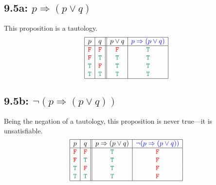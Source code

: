 \documentclass{article}
\begin{document}
\subsection*{9.5a: $p\Rightarrow(p\lor q)$}
This proposition is a tautology.
\[\begin{array}{|c|c||c|c|}
\hline
p&q&p\lor q&\textcolor{blue}{p\Rightarrow(p\lor q)}\\
\hline
\textcolor{red}{\tt{F}}&\textcolor{red}{\tt{F}}&\textcolor{red}{\tt{F}}&\textcolor{ForestGreen}{\tt{T}}\\
\textcolor{red}{\tt{F}}&\textcolor{ForestGreen}{\tt{T}}&\textcolor{ForestGreen}{\tt{T}}&\textcolor{ForestGreen}{\tt{T}}\\
\textcolor{ForestGreen}{\tt{T}}&\textcolor{red}{\tt{F}}&\textcolor{ForestGreen}{\tt{T}}&\textcolor{ForestGreen}{\tt{T}}\\
\textcolor{ForestGreen}{\tt{T}}&\textcolor{ForestGreen}{\tt{T}}&\textcolor{ForestGreen}{\tt{T}}&\textcolor{ForestGreen}{\tt{T}}\\
\hline
\end{array}\]
\subsection*{9.5b: $\neg(p\Rightarrow(p\lor q))$}
Being the negation of a tautology, this proposition is never true---it is unsatisfiable.
\[\begin{array}{|c|c||c|c|}
\hline
p&q&p\Rightarrow(p\lor q)&\textcolor{blue}{\neg(p\Rightarrow(p\lor q))}\\
\hline
\textcolor{red}{\tt{F}}&\textcolor{red}{\tt{F}}&\textcolor{ForestGreen}{\tt{T}}&\textcolor{red}{\tt{F}}\\
\textcolor{red}{\tt{F}}&\textcolor{ForestGreen}{\tt{T}}&\textcolor{ForestGreen}{\tt{T}}&\textcolor{red}{\tt{F}}\\
\textcolor{ForestGreen}{\tt{T}}&\textcolor{red}{\tt{F}}&\textcolor{ForestGreen}{\tt{T}}&\textcolor{red}{\tt{F}}\\
\textcolor{ForestGreen}{\tt{T}}&\textcolor{ForestGreen}{\tt{T}}&\textcolor{ForestGreen}{\tt{T}}&\textcolor{red}{\tt{F}}\\
\hline
\end{array}\]
\end{document}
